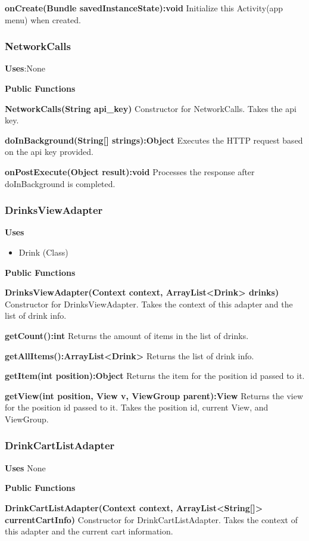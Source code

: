 \documentclass [10pt]{article}
\begin{document}
\textbf{onCreate(Bundle savedInstanceState):void}
Initialize this Activity(app menu) when created.

\subsubsection{NetworkCalls}
\textbf{Uses}:None

\textbf{Public Functions}

\textbf{NetworkCalls(String api\_key)}
Constructor for NetworkCalls. Takes the api key.

\textbf{doInBackground(String[] strings):Object}
Executes the HTTP request based on the api key provided.

\textbf{onPostExecute(Object result):void}
Processes the response after doInBackground is completed.

\subsubsection{DrinksViewAdapter}

\textbf{Uses}
\begin{itemize}
	\item Drink (Class)
\end{itemize}

\textbf{Public Functions}

\textbf{DrinksViewAdapter(Context context, ArrayList<Drink> drinks)}
Constructor for DrinksViewAdapter. Takes the context of this adapter and the list of drink info.

\textbf{getCount():int}
Returns the amount of items in the list of drinks.

\textbf{getAllItems():ArrayList<Drink>}
Returns the list of drink info.

\textbf{getItem(int position):Object}
Returns the item for the position id passed to it.

\textbf{getView(int position, View v, ViewGroup parent):View}
Returns the view for the position id passed to it. Takes the position id, current View, and ViewGroup.

\subsubsection{DrinkCartListAdapter}
\textbf{Uses} None

\textbf{Public Functions}

\textbf{DrinkCartListAdapter(Context context, ArrayList<String[]> currentCartInfo)}
Constructor for DrinkCartListAdapter. Takes the context of this adapter and the current cart information.
\end{document}
